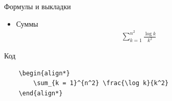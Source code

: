 \begin{frame}[fragile]{Формулы и выкладки}

\begin{itemize}
    \item Суммы
    \begin{align*}
        \sum_{k = 1}^{n^2} \frac{\log k}{k^2}
    \end{align*}
\end{itemize}

\begin{block}{Код}
    \begin{lstlisting}
    \begin{align*}
        \sum_{k = 1}^{n^2} \frac{\log k}{k^2}
    \end{align*}
    \end{lstlisting}
\end{block}

\end{frame}


